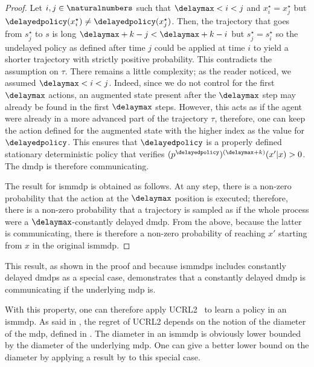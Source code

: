 \begin{proof}
    Let $i,j\in\naturalnumbers$ such that $\delaymax<i<j$ and  $x_i^\star=x_j^\star$ but $\delayedpolicy(x_i^\star)\neq \delayedpolicy(x_j^\star)$.
    Then, the trajectory that goes from $s_j^\star$ to $s$ is long $\delaymax+k-j<\delaymax+k-i$ but $s_j^\star=s_i^\star$ so the undelayed policy as defined after time $j$ could be applied at time $i$ to yield a shorter trajectory with strictly positive probability. This contradicts the assumption on $\tau$.
    There remains a little complexity; as the reader noticed, we assumed $\delaymax<i<j$.
    Indeed, since we do not control for the first $\delaymax$ actions, an augmented state present after the $\delaymax$ step may already be found in the first $\delaymax$ steps.
    However, this acts as if the agent were already in a more advanced part of the trajectory $\tau$, therefore, one can keep the action defined for the augmented state with the higher index as the value for $\delayedpolicy$.
    This ensures that $\delayedpolicy$ is a properly defined stationary deterministic policy that verifies $(p^\delayedpolicy)^{(\delaymax+k)}(x'\vert x)>0$. 
    The \gls{dmdp} is therefore communicating.
    
    The result for \gls{ismmdp} is obtained as follows.
    At any step, there is a non-zero probability that the action at the $\delaymax$ position is executed; therefore, there is a non-zero probability that a trajectory is sampled as if the whole process were a $\delaymax$-constantly delayed \gls{dmdp}.
    From the above, because the latter is communicating, there is therefore a non-zero probability of reaching $x'$ starting from $x$ in the original \gls{ismmdp}.
\end{proof}

\begin{remark}
    This result, as shown in the proof and because \glspl{ismmdp} includes constantly delayed \glspl{dmdp} as a special case, demonstrates that a constantly delayed \gls{dmdp} is communicating if the underlying \gls{mdp} is.
\end{remark}

With this property, one can therefore apply UCRL2~\cite{auer2008near} to learn a policy in an \gls{ismmdp}.
As said in , the regret of UCRL2 depends on the notion of the diameter of the \gls{mdp}, defined in .
The diameter in an \gls{ismmdp} is obviously lower bounded by the diameter of the underlying \gls{mdp}.
One can give a better lower bound on the diameter by applying a result by \cite{auer2008near} to this special case. 

